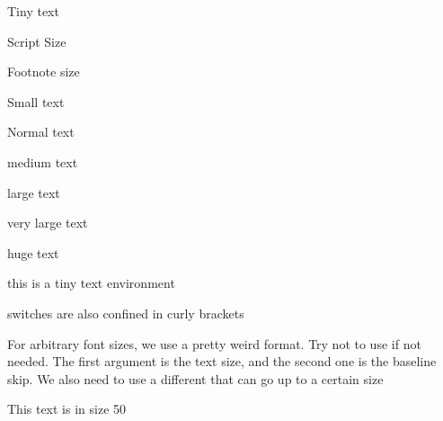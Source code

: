\documentclass[12pt]{report}
\begin{document}
\tiny Tiny text 

\scriptsize Script Size 

\footnotesize Footnote size 

\small Small text 

\normalsize Normal text 

\large medium text 

\Large large text 

\LARGE very large text 

\huge huge text


\normalsize 

\begin{tiny}
this is a tiny text environment 
\end{tiny}

{\huge switches are also confined in curly brackets}

For arbitrary font sizes, we use a pretty weird format. Try not to use if not needed. The first argument is the text size, and the second one is the baseline skip. We also need to use a different that can go up to a certain size 

{\fontsize{50}{55}\selectfont {}\selectfont This text is in size 50}
\end{document}
